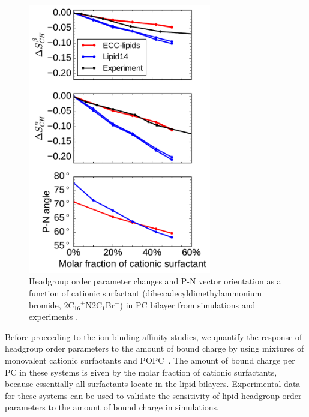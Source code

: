 \documentclass[aip,jcp,twocolumn]{revtex4}
\begin{document}
\begin{figure}[tbp]
  \centering
  \includegraphics[width=8.0cm]{../Fig/ipython_nb/PN_angle_OrdPars-A-B_L14-ECCL17_q80_sig89_surf.pdf}
  \caption{\label{OrderParameterCHANGESsurf}
    Headgroup order parameter changes and P-N vector orientation as a function of
    cationic surfactant (dihexadecyldimethylammonium bromide, 2C$_{16}$$^+$N2C$_1$Br$^-$)
    in PC bilayer from simulations and experiments \cite{scherer89}.
  }
\end{figure}

Before proceeding to the ion binding affinity studies, we quantify
the response of headgroup order parameters to the amount of 
bound charge by using mixtures of monovalent cationic surfactants
and POPC~\cite{scherer89}. The amount of bound charge per PC 
in these systems is given by the molar fraction of cationic 
surfactants, because essentially all surfactants locate in the 
lipid bilayers. Experimental data for these systems can be used to validate 
the sensitivity of lipid headgroup order parameters
to the amount of bound charge in simulations.

%
\end{document}
